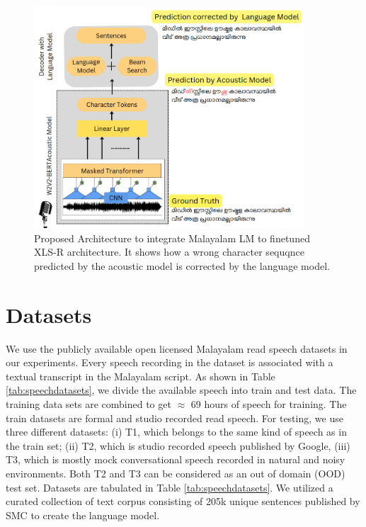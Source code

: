 \documentclass[runningheads]{llncs}
\begin{document}
\begin{figure}[htpb]
    
    \includegraphics[width=0.9\textwidth]{LM.png}
    \centering
    \caption{Proposed Architecture to integrate Malayalam LM to finetuned XLS-R architecture. It shows how a wrong character sequqnce predicted by the acoustic model is corrected by the language model.} 
    \label{Fig:LM-model}
\end{figure}
\section{Datasets}

\label{sec:datasets}


We use the publicly available open licensed Malayalam read speech datasets \cite{baby2016resources,he-etal-2020-open} in our experiments. Every speech recording in the dataset is associated with a textual transcript in the Malayalam script. As shown in Table \ref{tab:speechdatasets}, we divide the available speech into train and test data. The training data sets are combined to get $\approx$ 69 hours of speech for training. The train datasets are formal and studio recorded read speech. For testing, we use three different datasets: (i) T1, which belongs to the same kind of speech as in the train set; (ii) T2, which is studio recorded speech published by Google, (iii) T3, which is mostly mock conversational speech recorded in natural and noisy environments. Both T2 and T3 can be considered as an out of domain (OOD) test set. Datasets are tabulated in Table \ref{tab:speechdatasets}. We utilized a curated collection of text corpus consisting of 205k unique sentences published by SMC \cite{smctext} to create the language model. 
\end{document}
